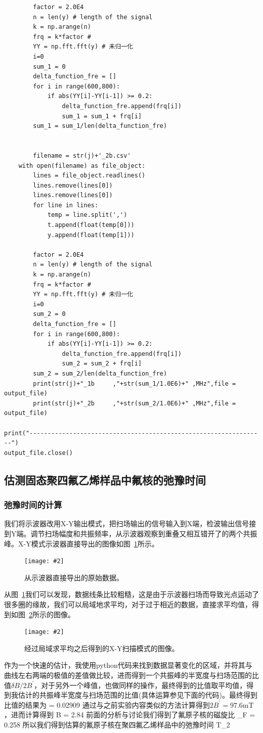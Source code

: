 \documentclass{ctexart}
\newcommand{\cpic}[2]{
\begin{center}
\texttt{[image: \#2]}
\end{center}
}
\newcommand{\cpicn}[3]
{
\begin{figure}[H]
\cpic{#1}{#2}
\caption{#3\label{#2}}
\end{figure}
}
\begin{document}
\begin{lstlisting}
        factor = 2.0E4
        n = len(y) # length of the signal
        k = np.arange(n)
        frq = k*factor #
        YY = np.fft.fft(y) # 未归一化
        i=0
        sum_1 = 0
        delta_function_fre = []
        for i in range(600,800):
            if abs(YY[i]-YY[i-1]) >= 0.2:
                delta_function_fre.append(frq[i])
                sum_1 = sum_1 + frq[i]
        sum_1 = sum_1/len(delta_function_fre)

        
        filename = str(j)+'_2b.csv'
    with open(filename) as file_object:
        lines = file_object.readlines()
        lines.remove(lines[0])
        lines.remove(lines[0])
        for line in lines:
            temp = line.split(',')
            t.append(float(temp[0]))
            y.append(float(temp[1]))
        
        factor = 2.0E4
        n = len(y) # length of the signal
        k = np.arange(n)
        frq = k*factor #
        YY = np.fft.fft(y) # 未归一化
        i=0
        sum_2 = 0
        delta_function_fre = []
        for i in range(600,800):
            if abs(YY[i]-YY[i-1]) >= 0.2:
                delta_function_fre.append(frq[i])
                sum_2 = sum_2 + frq[i]
        sum_2 = sum_2/len(delta_function_fre)
        print(str(j)+"_1b     ,"+str(sum_1/1.0E6)+" ,MHz",file = output_file)        
        print(str(j)+"_2b     ,"+str(sum_2/1.0E6)+" ,MHz",file = output_file)

print("-----------------------------------------------------------------")
output_file.close()
\end{lstlisting}
\subsection{估测固态聚四氟乙烯样品中氟核的弛豫时间}
\subsubsection{弛豫时间的计算}
我们将示波器改用X-Y输出模式，把扫场输出的信号输入到X端，检波输出信号接到Y端。调节扫场幅度和共振频率，从示波器观察到重叠又相互错开了的两个共振峰。X-Y模式示波器直接导出的图像如图~\ref{time}所示。
\cpicn{0.6}{time}{从示波器直接导出的原始数据。}
从图~\ref{time}我们可以发现，数据线条比较粗糙，这是由于示波器扫场而导致光点运动了很多圈的缘故，我们可以局域地求平均，对于过于相近的数据，直接求平均值，得到如图~\ref{time2}所示的图像。
\cpicn{0.6}{time2}{经过局域求平均之后得到的X-Y扫描模式的图像。}
作为一个快速的估计，我使用python代码来找到数据显著变化的区域，并将其与曲线左右两端的极值的差值做比较，进而得到一个共振峰的半宽度与扫场范围的比值$\delta B/2B^{\prime}$，对于另外一个峰值，也做同样的操作，最终得到的比值取平均值，得到我估计的共振峰半宽度与扫场范围的比值(具体运算参见下面的代码)。最终得到比值的结果为
\beq
{} = 0.02909
\eeq
通过与之前实验内容类似的方法计算得到$2B^{\prime} = 97.6 \mathrm{mT}$，进而计算得到
\beq
\delta B = 2.84 
\eeq
前面的分析与讨论我们得到了氟原子核的磁旋比
\beq
\gamma_F = 0.258 
\eeq
所以我们得到估算的氟原子核在聚四氟乙烯样品中的弛豫时间
\beq
T_2  
\eeq
\end{document}

